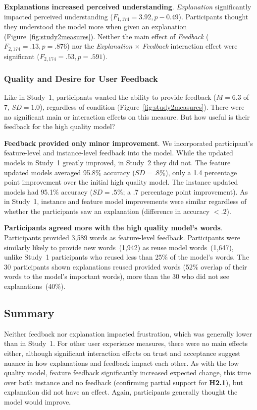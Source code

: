 \textbf{Explanations increased perceived understanding}.
%
\textit{Explanation} significantly impacted perceived understanding ($F_{1,174}=3.92, p-0.49$). Participants thought they understood the model more when given an explanation (Figure~\ref{fig:study2measures}). Neither the main effect of \textit{Feedback} ($F_{2,174}=.13, p=.876$) nor the \textit{Explanation} $\times$ \textit{Feedback} interaction effect were significant ($F_{2,174}=.53, p=.591$).

\subsubsection{Quality and Desire for User Feedback}
Like in Study~1, participants wanted the ability to provide feedback ($M=6.3$ of 7, $SD=1.0$), regardless of condition (Figure~\ref{fig:study2measures}). There were no significant main or interaction effects on this measure. But how useful is their feedback for the high quality model?

\textbf{Feedback provided only minor improvement}.
%
We incorporated participant's feature-level and instance-level feedback into the model.
While the updated models in Study~1 greatly improved, in Study~2 they did not. The feature updated models averaged 95.8\% accuracy ($SD=.8\%$), only a 1.4 percentage point improvement over the initial high quality model.
The instance updated models had 95.1\% accuracy ($SD=.5\%$; a .7 percentage point improvement). As in Study~1, instance and feature model improvements were similar regardless of whether the participants saw an explanation (difference in accuracy $<.2$).

\textbf{Participants agreed more with the high quality model's words}.
%
Participants provided 3,589 words as feature-level feedback. Participants were similarly likely to provide new words~(1,942) as reuse model words~(1,647), unlike Study~1 participants who reused less than 25\% of the model's words. 
The 30 participants shown explanations reused provided words (52\% overlap of their words to the model's important words), more than the 30 who did not see explanations~(40\%). %

\subsection{Summary}
%
Neither feedback nor explanation impacted frustration, which was generally lower than in Study~1.
For other user experience measures, there were no main effects either, although significant interaction effects on trust and acceptance suggest nuance in how explanations and feedback impact each other.
%
As with the low quality model, feature feedback significantly increased expected change, this time over both instance and no feedback (confirming partial support for \textbf{H2.1}), but explanation did not have an effect. Again, participants generally thought the model would improve. 


